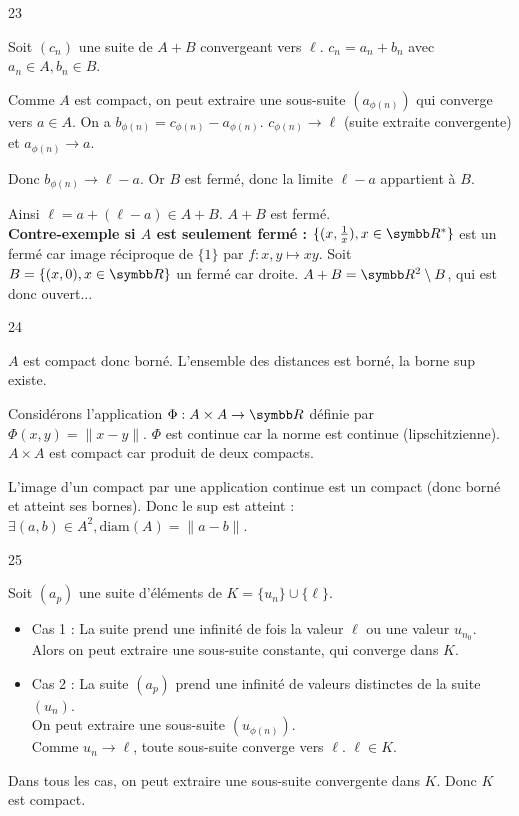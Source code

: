 \begin{correction}{23}

    Soit $(c_{n})$ une suite de $A+B$ convergeant vers $\ell$.
    $c_{n} = a_{n} + b_{n}$ avec $a_{n} \in A, b_{n} \in B$.

    Comme $A$ est compact, on peut extraire une sous-suite $(a_{\phi(n)})$ qui converge vers $a \in A$.
    On a $b_{\phi(n)} = c_{\phi(n)} - a_{\phi(n)}$.
    $c_{\phi(n)} \to \ell$ (suite extraite convergente) et $a_{\phi(n)} \to a$.

    Donc $b_{\phi(n)} \to \ell - a$.
    Or $B$ est fermé, donc la limite $\ell - a$ appartient à $B$.

    Ainsi $\ell = a + (\ell - a) \in A + B$.
    $A+B$ est fermé. \\

    \textbf{Contre-exemple si $A$ est seulement fermé :} $\{(x, \frac 1 x), x \in \R^*\}$ est un fermé car image réciproque de $\{1\}$ par $f: x,y \mapsto xy$. 
    Soit $B = \{(x, 0), x \in \R\}$ un fermé car droite. $A + B = \R^2 \setminus B$, qui est donc ouvert...
\end{correction}

\begin{correction}{24}

    $A$ est compact donc borné. L'ensemble des distances est borné, la borne sup existe.

    Considérons l'application $\Phi : A \times A \rightarrow \R$ définie par $\Phi(x,y) = \|x-y\|$.
    $\Phi$ est continue car la norme est continue (lipschitzienne).
    $A \times A$ est compact car produit de deux compacts.

    L'image d'un compact par une application continue est un compact (donc borné et atteint ses bornes).
    Donc le sup est atteint : $\exists (a,b) \in A^{2}, \text{diam}(A) = \|a-b\|$.
\end{correction}

\begin{correction}{25}

    Soit $(a_{p})$ une suite d'éléments de $K = \{u_{n}\} \cup \{\ell\}$.
    \begin{itemize}
    \item 
        Cas 1 : La suite prend une infinité de fois la valeur $\ell$ ou une valeur $u_{n_0}$. \\
        Alors on peut extraire une sous-suite constante, qui converge dans $K$.
    \item
        Cas 2 : La suite $(a_{p})$ prend une infinité de valeurs distinctes de la suite $(u_{n})$. \\
        On peut extraire une sous-suite $(u_{\phi(n)})$. \\
        Comme $u_{n} \to \ell$, toute sous-suite converge vers $\ell$.
        $\ell \in K$.
    \end{itemize}
    Dans tous les cas, on peut extraire une sous-suite convergente dans $K$.
    Donc $K$ est compact.
\end{correction}

